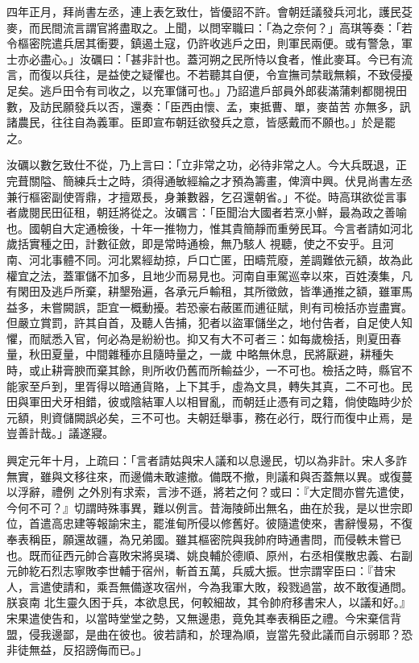 \begin{pinyinscope}
 四年正月，拜尚書左丞，連上表乞致仕，皆優詔不許。會朝廷議發兵河北，護民芟麥，而民間流言謂官將盡取之。上聞，以問宰職曰：「為之奈何？」高琪等奏：「若令樞密院遣兵居其衝要，鎮遏土寇，仍許收逃戶之田，則軍民兩便。或有警急，軍士亦必盡心。」汝礪曰：「甚非計也。蓋河朔之民所恃以食者，惟此麥耳。今已有流言，而復以兵往，是益使之疑懼也。不若聽其自便，令宣撫司禁戢無賴，不致侵擾足矣。逃戶田令有司收之，以充軍儲可也。」乃詔遣戶部員外郎裴滿蒲剌都閱視田數，及訪民願發兵以否，還奏：「臣西由懷、孟，東抵曹、單，麥苗苦
 亦無多，訊諸農民，往往自為義軍。臣即宣布朝廷欲發兵之意，皆感戴而不願也。」於是罷之。



 汝礪以數乞致仕不從，乃上言曰：「立非常之功，必待非常之人。今大兵既退，正完葺關隘、簡練兵士之時，須得通敏經綸之才預為籌畫，俾濟中興。伏見尚書左丞兼行樞密副使胥鼎，才擅眾長，身兼數器，乞召還朝省。」不從。時高琪欲從言事者歲閱民田征租，朝廷將從之。汝礪言：「臣聞治大國者若烹小鮮，最為政之善喻也。國朝自大定通檢後，十年一推物力，惟其貴簡靜而重勞民耳。今言者請如河北歲括實種之田，計數征斂，即是常時通檢，無乃駭人
 視聽，使之不安乎。且河南、河北事體不同。河北累經劫掠，戶口亡匿，田疇荒廢，差調難依元額，故為此權宜之法，蓋軍儲不加多，且地少而易見也。河南自車駕巡幸以來，百姓湊集，凡有閑田及逃戶所棄，耕墾殆遍，各承元戶輸租，其所徵斂，皆準通推之額，雖軍馬益多，未嘗闕誤，詎宜一概動擾。若恐豪右蔽匿而逋征賦，則有司檢括亦豈盡實。但嚴立賞罰，許其自首，及聽人告捕，犯者以盜軍儲坐之，地付告者，自足使人知懼，而賦悉入官，何必為是紛紛也。抑又有大不可者三：如每歲檢括，則夏田春量，秋田夏量，中間雜種亦且隨時量之，一歲
 中略無休息，民將厭避，耕種失時，或止耕膏腴而棄其餘，則所收仍舊而所輸益少，一不可也。檢括之時，縣官不能家至戶到，里胥得以暗通貨賂，上下其手，虛為文具，轉失其真，二不可也。民田與軍田犬牙相錯，彼或陰結軍人以相冒亂，而朝廷止憑有司之籍，倘使臨時少於元額，則資儲闕誤必矣，三不可也。夫朝廷舉事，務在必行，既行而復中止焉，是豈善計哉。」議遂寢。



 興定元年十月，上疏曰：「言者請姑與宋人議和以息邊民，切以為非計。宋人多詐無實，雖與文移往來，而邊備未敢遽撤。備既不撤，則議和與否蓋無以異。或復蔓以浮辭，禮例
 之外別有求索，言涉不遜，將若之何？或曰：『大定間亦嘗先遣使，今何不可？』切謂時殊事異，難以例言。昔海陵師出無名，曲在於我，是以世宗即位，首遣高忠建等報諭宋主，罷淮甸所侵以修舊好。彼隨遣使來，書辭慢易，不復奉表稱臣，願還故疆，為兄弟國。雖其樞密院與我帥府時通書問，而侵軼未嘗已也。既而征西元帥合喜敗宋將吳璘、姚良輔於德順、原州，右丞相僕散忠義、右副元帥紇石烈志寧敗李世輔于宿州，斬首五萬，兵威大振。世宗謂宰臣曰：『昔宋人，言遣使請和，乘吾無備遂攻宿州，今為我軍大敗，殺戮過當，故不敢復通問。朕哀南
 北生靈久困于兵，本欲息民，何較細故，其令帥府移書宋人，以議和好。』宋果遣使告和，以當時堂堂之勢，又無邊患，竟免其奉表稱臣之禮。今宋棄信背盟，侵我邊鄙，是曲在彼也。彼若請和，於理為順，豈當先發此議而自示弱耶？恐非徒無益，反招謗侮而已。」




\end{pinyinscope}

